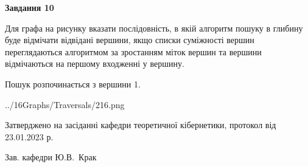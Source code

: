 \documentclass[12pt, ukrainian]{article}
\begin{document}
{\begin {large}
{\begin {center}\textbf{Завдання 10}\end {center}}\par
Для графа на рисунку вказати послідовність, в якій алгоритм пошуку в глибину буде відмічати відвідані вершини, якщо списки суміжності вершин переглядаються алгоритмом за зростанням міток вершин та вершини відмічаються на першому вход\-женні у вершину.\par
Пошук розпочинається з вершини 1.\par

\begin{center}
	{../16Graphs/Traversals/216.png}
\end{center}\par
\newpage


\end {large}
}
{\smallskip \begin {small} Затверджено на засіданні кафедри теоретичної кібернетики, протокол  від   23.01.2023 р.\par\smallskip\smallskip
{\parbox {6.5 cm}{Зав. кафедри \dotfill Ю.В.~Крак}} \end{small}}
\end{document}
